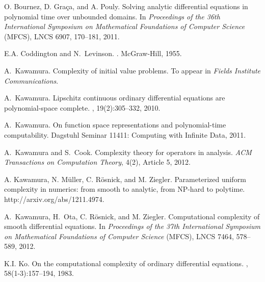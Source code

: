 \documentclass[12pt,a4paper]{article}
\theoremstyle{definition}
\theoremstyle{remark}
\begin{document}
\begin{thebibliography}{10}

O. Bournez, D. Gra{\c c}a, and A. Pouly.
\newblock Solving analytic differential equations in polynomial time over unbounded domains.
\newblock In {\em Proceedings of the 36th International Symposium on Mathematical Foundations of Computer Science} (MFCS), 
LNCS 6907, 170--181, 2011.

E.A. Coddington and N.~Levinson.
.
\newblock McGraw-Hill, 1955.

A.~Kawamura.
\newblock Complexity of initial value problems.
\newblock To appear in {\em Fields Institute Communications}.

A.~Kawamura.
\newblock Lipschitz continuous ordinary differential equations are
  polynomial-space complete.
, 19(2):305--332, 2010.

A.~Kawamura.
\newblock On function space representations and polynomial-time computability.
\newblock Dagstuhl Seminar 11411: Computing with Infinite Data, 2011.

A.~Kawamura and S.~Cook.
\newblock Complexity theory for operators in analysis.
\newblock \emph{ACM Transactions on Computation Theory}, 4(2), Article 5, 2012.

A. Kawamura, N. M{\"u}ller, C. R{\"o}snick, and M. Ziegler.
\newblock Parameterized uniform complexity in numerics: from smooth to analytic, from NP-hard to polytime. 
\newblock http://arxiv.org/abs/1211.4974. 

A.~Kawamura, H.~Ota, C. R{\"o}snick, and M. Ziegler.
\newblock Computational complexity of smooth differential equations. 
\newblock In \emph{Proceedings of the 37th International Symposium on Mathematical Foundations of Computer Science} (MFCS), 
LNCS 7464, 578--589, 2012. 

K.I. Ko.
\newblock On the computational complexity of ordinary differential equations.
, 58(1-3):157--194, 1983.


\end{thebibliography}
\end{document}
